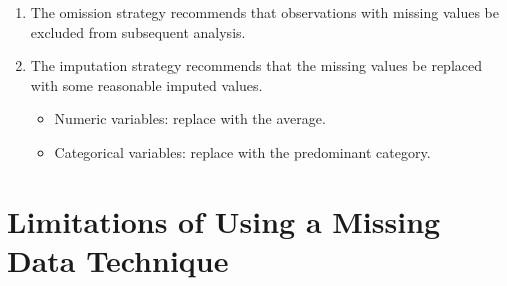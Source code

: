 \documentclass[
  letterpaper,
  DIV=11,
  numbers=noendperiod]{scrreprt}
\providecommand{\tightlist}{%
  \setlength{\itemsep}{0pt}\setlength{\parskip}{0pt}}\usepackage{longtable,booktabs,array}
\begin{document}
\begin{enumerate}
\def\labelenumi{\arabic{enumi}.}
\item
  The omission strategy recommends that observations with missing values
  be excluded from subsequent analysis.
\item
  The imputation strategy recommends that the missing values be replaced
  with some reasonable imputed values.

  \begin{itemize}
  \tightlist
  \item
    Numeric variables: replace with the average.
  \item
    Categorical variables: replace with the predominant category.
  \end{itemize}
\end{enumerate}

\section{Limitations of Using a Missing Data
Technique}\label{limitations-of-using-a-missing-data-technique}
\end{document}
